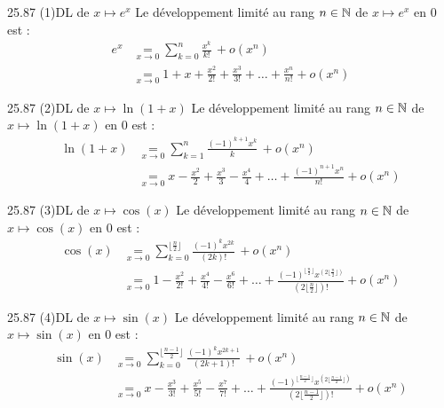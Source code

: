 \begin{adjustwidth}{-3cm}{-3cm}
\begin{proposition}{25.87 (1)}{DL de $x \mapsto e^x$}
    Le développement limité au rang $n \in \mathbb{N}$ de $x \mapsto e^x$ en $0$ est :
    \begin{align*}
        e^x &\underset{x \to 0}{=} \sum_{k=0}^{n} \frac{x^k}{k!} \, + o(x^n) \\
        &\underset{x \to 0}{=} 1 + x + \frac{x^2}{2!} + \frac{x^3}{3!} + \dots + \frac{x^n}{n!} + o(x^n)
    \end{align*}
\end{proposition}

\begin{proposition}{25.87 (2)}{DL de $x \mapsto \ln(1+x)$}
    Le développement limité au rang $n \in \mathbb{N}$ de $x \mapsto \ln(1+x)$  en $0$ est :
    \begin{align*}
        \ln(1+x) &\underset{x \to 0}{=} \sum_{k=1}^{n} \frac{(-1)^{k+1}x^k}{k} \, + o(x^n) \\
        &\underset{x \to 0}{=} x - \frac{x^2}{2} + \frac{x^3}{3} - \frac{x^4}{4} + \dots + \frac{(-1)^{n+1}x^n}{n!} + o(x^n)
    \end{align*}
\end{proposition}

\begin{proposition}{25.87 (3)}{DL de $x \mapsto \cos(x)$}
    Le développement limité au rang $n \in \mathbb{N}$ de $x \mapsto \cos(x)$ en $0$ est :
    \begin{align*}
        \cos(x) &\underset{x \to 0}{=} \sum_{k=0}^{\lfloor \frac{n}{2} \rfloor} \frac{(-1)^{k}x^{2k}}{(2k)!} \, + o(x^n) \\
        &\underset{x \to 0}{=} 1 - \frac{x^2}{2!} + \frac{x^4}{4!} - \frac{x^6}{6!} + \dots + \frac{(-1)^{\lfloor \frac{n}{2}\rfloor} x^{(2\lfloor\frac{n}{2}\rfloor)}}{(2\lfloor\frac{n}{2}\rfloor)!} + o(x^n)
    \end{align*}
\end{proposition}

\begin{proposition}{25.87 (4)}{DL de $x \mapsto \sin(x)$}
    Le développement limité au rang $n \in \mathbb{N}$ de $x \mapsto \sin(x)$ en $0$ est :
    \begin{align*}
        \sin(x) &\underset{x \to 0}{=} \sum_{k=0}^{\lfloor \frac{n-1}{2} \rfloor} \frac{(-1)^{k}x^{2k+1}}{(2k+1)!} \, + o(x^n) \\
        &\underset{x \to 0}{=} x - \frac{x^3}{3!} + \frac{x^5}{5!} - \frac{x^7}{7!} + \dots + \frac{(-1)^{\lfloor \frac{n-1}{2}\rfloor} x^{(2\lfloor\frac{n-1}{2}\rfloor)}}{(2\lfloor\frac{n-1}{2}\rfloor)!} + o(x^n)
    \end{align*}
\end{proposition}


\end{adjustwidth}
